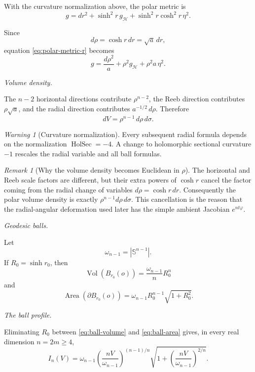 \documentclass[11pt,reqno]{amsart}
\numberwithin{equation}{section}
\theoremstyle{definition}
\theoremstyle{remark}
\newtheorem{remark}[theorem]{Remark}
\newtheorem{warning}[theorem]{Warning}
\newcommand{\Area}{\operatorname{Area}}
\newcommand{\Vol}{\operatorname{Vol}}
\newcommand{\ithead}[1]{%
  \par\medskip\noindent\textit{#1}\enspace
}
\begin{document}
With the curvature normalization above, the polar metric is
\begin{equation}
g
=
dr^2
+
\sinh^2r\,g_{\mathcal H}
+
\sinh^2r\cosh^2r\,\eta^2.
\label{eq:polar-metric-r}
\end{equation}

Since
\[
d\rho=\cosh r\,dr=\sqrt a\,dr,
\]
equation \eqref{eq:polar-metric-r} becomes
\[
g
=
\frac{d\rho^2}{a}
+
\rho^2g_{\mathcal H}
+
\rho^2a\,\eta^2.
\]

\ithead{Volume density.}

The \(n-2\) horizontal directions contribute \(\rho^{n-2}\), the Reeb
direction contributes \(\rho\sqrt a\), and the radial direction contributes
\(a^{-1/2}\,d\rho\). Therefore
\begin{equation}
dV
=
\rho^{n-1}\,d\rho\,d\sigma.
\label{eq:polar-volume}
\end{equation}

\begin{warning}[Curvature normalization]
Every subsequent radial formula depends on the normalization
\(\operatorname{HolSec}=-4\). A change to holomorphic sectional curvature
\(-1\) rescales the radial variable and all ball formulas.
\end{warning}

\begin{remark}[Why the volume density becomes Euclidean in $\rho$]
The horizontal and Reeb scale factors are different, but their extra powers
of $\cosh r$ cancel the factor coming from the radial change of variables
$d\rho=\cosh r\,dr$.  Consequently the polar volume density is exactly
$\rho^{n-1}d\rho\,d\sigma$.  This cancellation is the reason that the
radial-angular deformation used later has the simple ambient Jacobian
$e^{nt\varphi}$.
\end{remark}

\ithead{Geodesic balls.}

Let
\[
\omega_{n-1}=|\mathbb S^{n-1}|.
\]
If \(R_0=\sinh r_0\), then
\begin{equation}
\Vol(B_{r_0}(o))
=
\frac{\omega_{n-1}}{n}R_0^n
\label{eq:ball-volume}
\end{equation}
and
\begin{equation}
\Area(\partial B_{r_0}(o))
=
\omega_{n-1}R_0^{n-1}\sqrt{1+R_0^2}.
\label{eq:ball-area}
\end{equation}

\ithead{The ball profile.}

Eliminating \(R_0\) between \eqref{eq:ball-volume} and
\eqref{eq:ball-area} gives, in every real dimension \(n=2m\ge4\),
\begin{equation}
I_n(V)
=
\omega_{n-1}
\left(\frac{nV}{\omega_{n-1}}\right)^{(n-1)/n}
\sqrt{
1+
\left(\frac{nV}{\omega_{n-1}}\right)^{2/n}
}.
\label{eq:ball-profile}
\end{equation}
\end{document}
